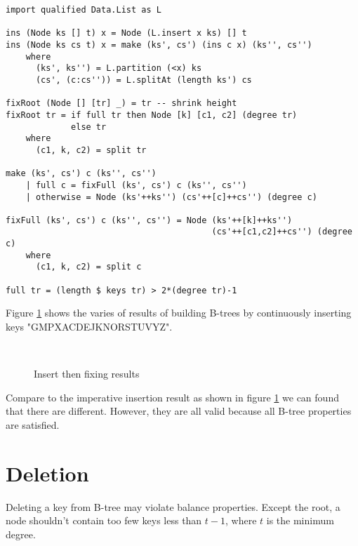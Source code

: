 \documentclass[UTF8]{article}
\begin{document}
\lstset{language=Haskell}
\begin{lstlisting}
import qualified Data.List as L

ins (Node ks [] t) x = Node (L.insert x ks) [] t
ins (Node ks cs t) x = make (ks', cs') (ins c x) (ks'', cs'')
    where
      (ks', ks'') = L.partition (<x) ks
      (cs', (c:cs'')) = L.splitAt (length ks') cs

fixRoot (Node [] [tr] _) = tr -- shrink height
fixRoot tr = if full tr then Node [k] [c1, c2] (degree tr)
             else tr
    where
      (c1, k, c2) = split tr

make (ks', cs') c (ks'', cs'')
    | full c = fixFull (ks', cs') c (ks'', cs'')
    | otherwise = Node (ks'++ks'') (cs'++[c]++cs'') (degree c)

fixFull (ks', cs') c (ks'', cs'') = Node (ks'++[k]++ks'')
                                         (cs'++[c1,c2]++cs'') (degree c)
    where
      (c1, k, c2) = split c

full tr = (length $ keys tr) > 2*(degree tr)-1
\end{lstlisting}

Figure \ref{fig:btree-insert-fp} shows the varies of results of building B-trees
by continuously inserting keys "GMPXACDEJKNORSTUVYZ".

\begin{figure}[htbp]
  \centering
   \\
    \caption{Insert then fixing results} \label{fig:btree-insert-fp}
\end{figure}

Compare to the imperative insertion result
as shown in figure \ref{fig:btree-insert-fp}
we can found that there are different. However, they are all valid
because all B-tree properties
are satisfied.


\section{Deletion}

Deleting a key from
B-tree may violate balance properties. Except the root, a node shouldn't
contain too few keys less than $t-1$, where $t$ is the
minimum degree.
\end{document}
